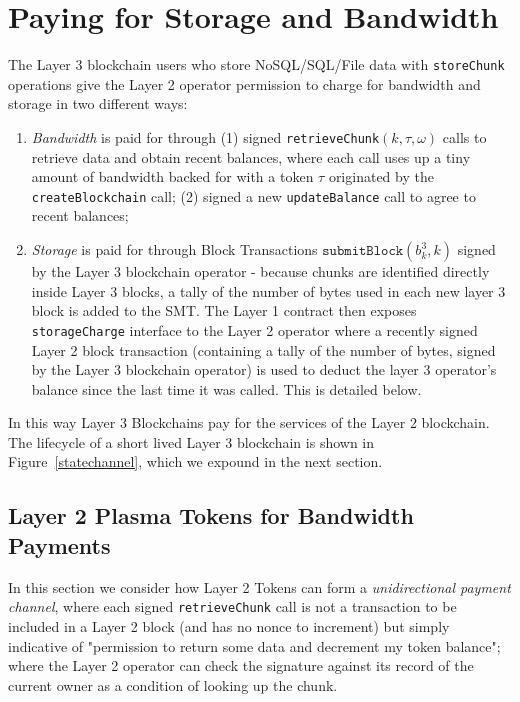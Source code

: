 \documentclass{article}
\newcommand{\blockhash}[2]{b^{#1}_{#2}}
\newcommand{\signature}{\omega}
\newcommand{\submitblock}[2]{\texttt{submitBlock}(#2, #1)}
\begin{document}
\section{Paying for Storage and Bandwidth}
The Layer 3 blockchain users who store NoSQL/SQL/File data with
\texttt{storeChunk} operations give the Layer 2 operator permission to charge for bandwidth and storage in two different ways:

\begin{enumerate}
\item {\em Bandwidth} is paid for through (1) signed  \texttt{retrieveChunk}$(k, \tau, \signature)$ calls to retrieve data and obtain recent balances, where each call uses up a tiny amount of bandwidth backed for with a token $\tau$ originated by the \texttt{createBlockchain} call; (2) signed a new \texttt{updateBalance} call to agree to recent balances;

\item {\em Storage} is paid for through Block Transactions $\submitblock{k}{\blockhash{3}{k}}$ signed by the Layer 3 blockchain operator - because chunks are identified directly inside Layer 3 blocks, a tally of the number of bytes used in each new layer 3 block is added to the SMT.  The Layer 1 contract then exposes \texttt{storageCharge} interface to the Layer 2 operator where a recently signed Layer 2 block transaction (containing a tally of the number of bytes, signed by the Layer 3 blockchain operator) is used to deduct the layer 3 operator's balance since the last time it was called.   This is detailed below.
\end{enumerate}
In this way Layer 3 Blockchains pay for the services of the Layer 2 blockchain.  The lifecycle of a short lived Layer 3 blockchain is shown in Figure~\ref{statechannel}, which we expound in the next section.

\subsection{Layer 2 Plasma Tokens for Bandwidth Payments}

In this section we  consider how Layer 2 Tokens can form a {\em unidirectional payment channel}, where each signed \texttt{retrieveChunk} call is not a transaction to be included in a Layer 2 block (and has no nonce to increment) but simply indicative of "permission to return some data and decrement my token balance"; where the Layer 2 operator can check the signature against its record of the current owner as a condition of looking up the chunk.
\end{document}
